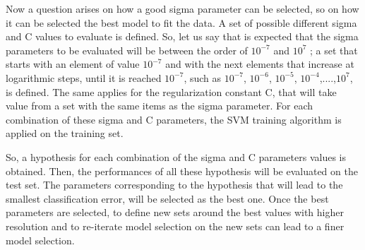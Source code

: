 \documentclass[aps,letterpaper,10pt]{revtex4}
\begin{document}
Now a question arises on how a good sigma parameter can be selected, so on how it can be selected the best model to fit the data. A set of possible different sigma and C values to evaluate is defined. So, let us say that is expected that the sigma parameters to be evaluated will be between the order of $10^{-7}$ and $10^{7}$ ; a set that starts with an element of value $10^{-7}$ and with the next elements that increase at logarithmic steps, until it is reached $10^{-7}$, such as {$10^{-7}$, $10^{-6}$, $10^{-5}$, $10^{-4}$,....,$10^{7}$}, is defined. The same applies for the regularization constant C, that will take value from a set with the same items as the sigma parameter. For each combination of these sigma and C parameters, the SVM training algorithm is applied on the training set. 

So, a hypothesis for each combination of the sigma and C parameters values is obtained. Then, the performances of all these hypothesis will be evaluated on the test set. The parameters corresponding to the hypothesis that will lead to the smallest classification error, will be selected as the best one. Once the best parameters are selected, to define new sets around the best values with higher resolution and to re-iterate model selection on the new sets can lead to a finer model selection. 
\end{document}

